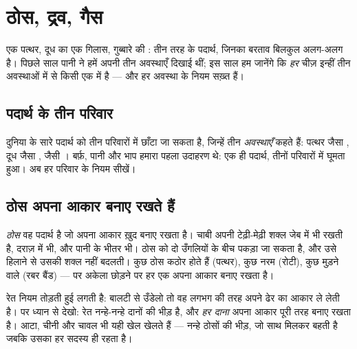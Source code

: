 \chapter{ठोस, द्रव, गैस}\label{ch:g3:solids-liquids-gases}

एक पत्थर, दूध का एक गिलास, गुब्बारे की : तीन तरह के पदार्थ, जिनका
बरताव बिलकुल अलग-अलग है। पिछले साल पानी ने हमें अपनी तीन अवस्थाएँ
दिखाई थीं; इस साल हम जानेंगे कि \emph{हर} चीज़ इन्हीं तीन अवस्थाओं में
से किसी एक में है --- और हर अवस्था के नियम सख़्त हैं।

\section{पदार्थ के तीन परिवार}

दुनिया के सारे पदार्थ को तीन परिवारों में छाँटा जा सकता है, जिन्हें
तीन \emph{अवस्थाएँ} कहते हैं: पत्थर जैसा , दूध जैसा , 
जैसी । बर्फ़, पानी और भाप हमारा पहला उदाहरण थे: एक ही पदार्थ,
तीनों परिवारों में घूमता हुआ। अब हर परिवार के नियम सीखें।

\section{ठोस अपना आकार बनाए रखते हैं}

\begin{definition}[ठोस]\label{def:g3:solids-liquids-gases:solid}
\emph{ठोस} वह पदार्थ है जो अपना आकार ख़ुद बनाए रखता है।
चाबी अपनी टेढ़ी-मेढ़ी शक्ल जेब में भी रखती है, दराज़ में भी, और पानी के
भीतर भी। ठोस को दो उँगलियों के बीच पकड़ा जा सकता है, और उसे हिलाने
से उसकी शक्ल नहीं बदलती। कुछ ठोस कठोर होते हैं (पत्थर), कुछ नरम
(रोटी), कुछ मुड़ने वाले (रबर बैंड) --- पर अकेला छोड़ने पर हर एक अपना
आकार बनाए रखता है।
\end{definition}

\begin{example}[दानों से बना एक ठोस]\label{ex:g3:solids-liquids-gases:sand}
रेत नियम तोड़ती हुई लगती है: बालटी से उँडेलो तो वह लगभग  की तरह
अपने ढेर का आकार ले लेती है। पर ध्यान से देखो: रेत नन्हे-नन्हे 
दानों की भीड़ है, और \emph{हर दाना} अपना आकार पूरी तरह बनाए रखता है।
आटा, चीनी और चावल भी यही खेल खेलते हैं --- नन्हे ठोसों की भीड़, जो
साथ मिलकर बहती है जबकि उसका हर सदस्य  ही रहता है।
\end{example}

